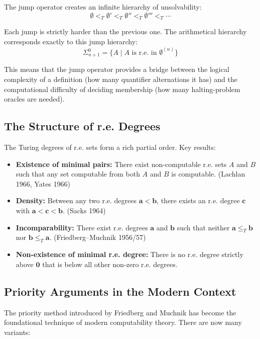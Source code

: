 The jump operator creates an infinite hierarchy of unsolvability:
\[
\emptyset <_T \emptyset' <_T \emptyset'' <_T \emptyset''' <_T \cdots
\]

Each jump is strictly harder than the previous one. The arithmetical hierarchy corresponds exactly to this jump hierarchy:
\[
\Sigma^0_{n+1} = \{ A \mid A \text{ is r.e. in } \emptyset^{(n)} \}
\]

This means that the jump operator provides a bridge between the logical complexity of a definition (how many quantifier alternations it has) and the computational difficulty of deciding membership (how many halting-problem oracles are needed).

\subsection{The Structure of r.e. Degrees}

The Turing degrees of r.e. sets form a rich partial order. Key results:

\begin{itemize}
\item \textbf{Existence of minimal pairs:} There exist non-computable r.e. sets $A$ and $B$ such that any set computable from both $A$ and $B$ is computable. (Lachlan 1966, Yates 1966)
\item \textbf{Density:} Between any two r.e. degrees $\mathbf{a} < \mathbf{b}$, there exists an r.e. degree $\mathbf{c}$ with $\mathbf{a} < \mathbf{c} < \mathbf{b}$. (Sacks 1964)
\item \textbf{Incomparability:} There exist r.e. degrees $\mathbf{a}$ and $\mathbf{b}$ such that neither $\mathbf{a} \le_T \mathbf{b}$ nor $\mathbf{b} \le_T \mathbf{a}$. (Friedberg--Muchnik 1956/57)
\item \textbf{Non-existence of minimal r.e. degree:} There is no r.e. degree strictly above $\mathbf{0}$ that is below all other non-zero r.e. degrees.
\end{itemize}

\subsection*{Priority Arguments in the Modern Context}

The priority method introduced by Friedberg and Muchnik has become the foundational technique of modern computability theory. There are now many variants:

